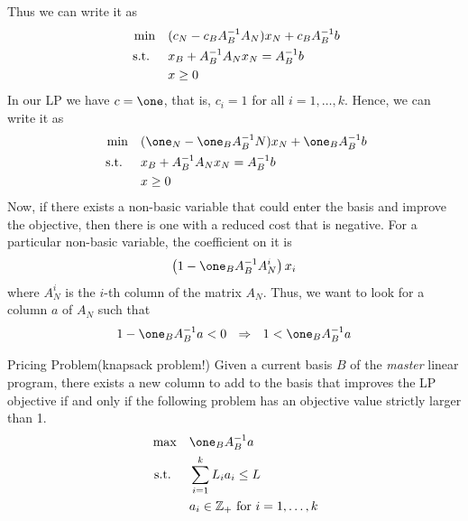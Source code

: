 Thus we can write it as 
 \begin{equation}
 \label{LP:basis-solution2}
\begin{split}
\min \quad & (c_N  - c_B A_B^{-1} A_N) x_N + c_B A_B^{-1} b  \\
\mbox{ s.t. }  \quad &x_B +  A_B^{-1} A_N x_N = A_B^{-1}b\\
& x \geq 0
\end{split}
\end{equation}
In our LP we have $c = \one$, that is, $c_i =1$ for all $i=1, \dots, k$.  Hence, we can write it as 
 \begin{equation}
 \label{LP:basis-solution3}
\begin{split}
\min \quad & (\one_N  - \one_B A_B^{-1} N) x_N + \one_B A_B^{-1} b  \\
\st  \quad &x_B +  A_B^{-1} A_N x_N = A_B^{-1}b\\
& x \geq 0
\end{split}
\end{equation}
Now, if there exists a non-basic variable that could enter the basis and improve the objective, then there is one with a reduced cost that is negative.  For a particular non-basic variable, the coefficient on it is
\begin{equation}
\left( 1 -  \one_B A_B^{-1} A_N^i\right) x_i
\end{equation}
where $A_N^i$ is the $i$-th column of the matrix $A_N$.  Thus, we want to look for a column $a$ of $A_N$ such that 
\begin{equation}
1 -  \one_B A_B^{-1} a < 0 \ \  \Rightarrow \ \   1 < \one_B A_B^{-1} a
\end{equation}
\begin{general}{Pricing Problem}{(knapsack problem!)}
Given a current basis $B$ of the \emph{master} linear program, there exists a new column to add to the basis that improves the LP objective if and only if the following problem has an objective value strictly larger than 1.
\begin{equation}
\begin{split}
\max\quad  &\one_B A_B^{-1} a\\
\st \quad & \sum_{i=1}^k L_i a_i \leq L\\
& a_i \in \Z_+ \text{ for } i=1, \dots, k
\end{split}
\end{equation}
\end{general}

